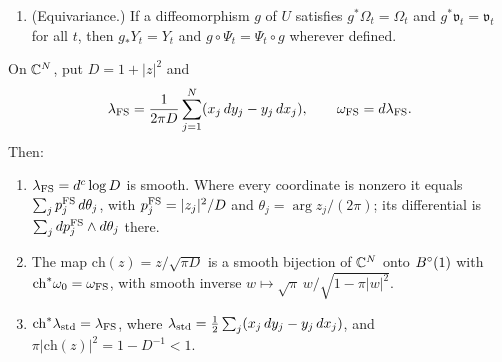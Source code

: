 \begin{lemma}
\begin{enumerate}[label=(\alph*)]
$[0,1]\times U$ (up to the boundary), with every $\Omega^{(j)}_s$ closed and nondegenerate on $U$,
$\partial_s\Omega^{(j)}_s=d\mathfrak v^{(j)}_s$, and $\Omega^{(j)}_1=\Omega^{(j+1)}_0$. With the clocks $\sigma_j$ of
 put $(\Omega_t,\mathfrak v_t)=(\Omega^{(j)}_{\sigma_j(t)},\sigma_j'(t)\mathfrak v^{(j)}_{\sigma_j(t)})$ on $[t_{j-1},t_j]$,
$(\Omega_t,\mathfrak v_t)=(\Omega^{(1)}_0,0)$ for $t\le0$ and $(\Omega_t,\mathfrak v_t)=(\Omega^{(N)}_1,0)$ for $t\ge1$. Then
$(\Omega_t,\mathfrak v_t)_{t\in\R}$ satisfies the hypotheses with $I=\R$, and its time-one map is
$\Psi_1=\Psi^{(N)}_1\circ\dots\circ\Psi^{(1)}_1$ wherever the right side is defined.
\item (Equivariance.) If a diffeomorphism $g$ of $U$ satisfies $g^*\Omega_t=\Omega_t$ and $g^*\mathfrak v_t=\mathfrak v_t$ for all $t$,
then $g_*Y_t=Y_t$ and $g\circ\Psi_t=\Psi_t\circ g$ wherever defined.
\end{enumerate}
\end{lemma}

\begin{lemma}\label{I:lem:pre-fs}
On $\mathbb{C}^N$, put $D=1+|z|^2$ and
\[
 \lambda_{\rm FS}=
 \frac{1}{2\pi D}\sum_{j=1}^N(x_j\,dy_j-y_j\,dx_j),\qquad
 \omega_{\rm FS}=d\lambda_{\rm FS}.
\]
Then:
\begin{enumerate}[label=(\alph*)]
\item $\lambda_{\rm FS}=d^c\log D$ is smooth. Where every coordinate is nonzero it equals
 $\sum_j p_j^{\rm FS}\,d\theta_j$, with $p_j^{\rm FS}=|z_j|^2/D$ and
 $\theta_j=\arg z_j/(2\pi)$; its differential is $\sum_jdp_j^{\rm FS}\wedge d\theta_j$ there.
\item The map $\mathrm{ch}(z)=z/\sqrt{\pi D}$ is a smooth bijection of $\mathbb{C}^N$ onto $B^{\circ}(1)$ with $\mathrm{ch}^*\omega_0=\omega_{\rm FS}$,
 with smooth inverse $w\mapsto\sqrt\pi\,w/\sqrt{1-\pi|w|^2}$.
\item $\mathrm{ch}^*\lambda_{\rm std}=\lambda_{\rm FS}$, where
 $\lambda_{\rm std}=\frac12\sum_j(x_j\,dy_j-y_j\,dx_j)$, and
 $\pi|\mathrm{ch}(z)|^2=1-D^{-1}<1$.
\end{enumerate}
\end{lemma}

